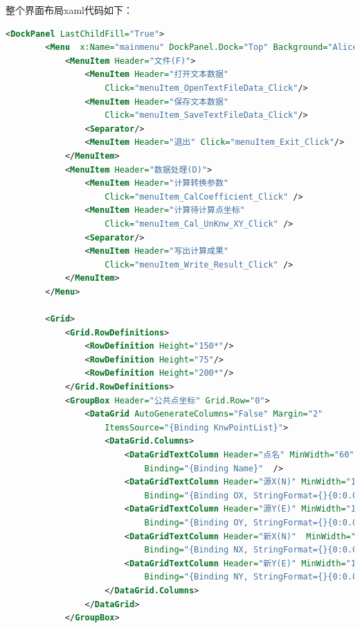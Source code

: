 整个界面布局xaml代码如下：
\begin{lstlisting}[language=xml]
<DockPanel LastChildFill="True">
        <Menu  x:Name="mainmenu" DockPanel.Dock="Top" Background="AliceBlue">
            <MenuItem Header="文件(F)">
                <MenuItem Header="打开文本数据"
                    Click="menuItem_OpenTextFileData_Click"/>
                <MenuItem Header="保存文本数据"
                    Click="menuItem_SaveTextFileData_Click"/>
                <Separator/>
                <MenuItem Header="退出" Click="menuItem_Exit_Click"/>
            </MenuItem>
            <MenuItem Header="数据处理(D)">
                <MenuItem Header="计算转换参数" 
                    Click="menuItem_CalCoefficient_Click" />
                <MenuItem Header="计算待计算点坐标" 
                    Click="menuItem_Cal_UnKnw_XY_Click" />
                <Separator/>
                <MenuItem Header="写出计算成果" 
                    Click="menuItem_Write_Result_Click" />
            </MenuItem>
        </Menu>

        <Grid>
            <Grid.RowDefinitions>
                <RowDefinition Height="150*"/>
                <RowDefinition Height="75"/>
                <RowDefinition Height="200*"/>
            </Grid.RowDefinitions>
            <GroupBox Header="公共点坐标" Grid.Row="0">
                <DataGrid AutoGenerateColumns="False" Margin="2" 
                    ItemsSource="{Binding KnwPointList}">
                    <DataGrid.Columns>
                        <DataGridTextColumn Header="点名" MinWidth="60"
                            Binding="{Binding Name}"  />
                        <DataGridTextColumn Header="源X(N)" MinWidth="100"
                            Binding="{Binding OX, StringFormat={}{0:0.000}}"/>
                        <DataGridTextColumn Header="源Y(E)" MinWidth="100"
                            Binding="{Binding OY, StringFormat={}{0:0.000}}"/>
                        <DataGridTextColumn Header="新X(N)"  MinWidth="100"
                            Binding="{Binding NX, StringFormat={}{0:0.000}}"/>
                        <DataGridTextColumn Header="新Y(E)" MinWidth="100"
                            Binding="{Binding NY, StringFormat={}{0:0.000}}"/>
                    </DataGrid.Columns>
                </DataGrid>
            </GroupBox>


\end{lstlisting}
